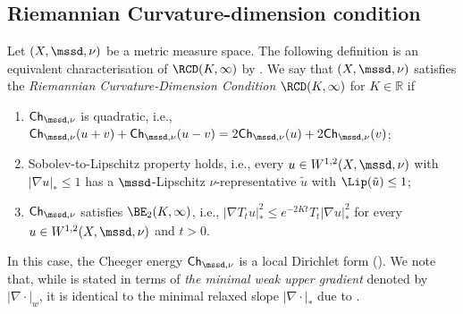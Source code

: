 \documentclass[11pt,letterpaper]{amsart}
\newcommand{\Ch}{\mathsf{Ch}}
\newcommand{\R}{{\mathbb R}}
\newcommand{\purple}[1]{{\color{purple}#1}}
\newcommand{\E}{\mathcal E}
\newcommand{\F}{\mathcal F}
\renewcommand{\1}{\mathbf 1}
\numberwithin{equation}{section}
\theoremstyle{plain}
\theoremstyle{definition}
\newtheorem{defs}[thm]{Definition}%
\theoremstyle{remark}
\begin{document}
\subsection{Riemannian Curvature-dimension condition}

Let $(X, \mssd, \nu)$ be a metric measure space. 
 The following definition is an equivalent characterisation of $\RCD(K,\infty)$ by \cite[Cor.\ 4.18]{AmbGigSav15}.
We say that $(X, \mssd, \nu)$ satisfies the {\it Riemannian Curvature-Dimension Condition} $\RCD(K,\infty)$ for $K \in \R$ if 
\begin{enumerate}[{\rm (i)}]
\item $\Ch_{\mssd, \nu}$ is quadratic, i.e., $\Ch_{\mssd, \nu}(u+v)+\Ch_{\mssd, \nu}(u-v)= 2\Ch_{\mssd, \nu}(u)+2\Ch_{\mssd, \nu}(v)$; 
\item Sobolev-to-Lipschitz property holds, i.e., every $u \in W^{1,2}(X, \mssd, \nu)$ with $|\nabla u|_* \le 1$ has a $\mssd$-Lipschitz $\nu$-representative $\tilde{u}$ with $\Lip(\tilde{u}) \le 1$;
\item $\Ch_{\mssd, \nu}$ satisfies $\BE_2(K,\infty)$, i.e., $|\nabla T_t u|^2_* \le e^{-2Kt} T_t|\nabla u|^2_*$ for every $u \in W^{1,2}(X, \mssd, \nu)$ and $t>0$.  
\end{enumerate}
In this case, the Cheeger energy $\Ch_{\mssd, \nu}$ is a local Dirichlet form (\cite[\S 4.3]{AmbGigSav14b}). We note that, while \cite[Cor.\ 4.18]{AmbGigSav15} is stated in terms of {\it the minimal weak upper gradient} denoted by $|\nabla\cdot|_w$, it is identical to the minimal relaxed slope $|\nabla \cdot|_*$ due to \cite[Thm.~6.2]{AmbGigSav14}.



\end{document}
